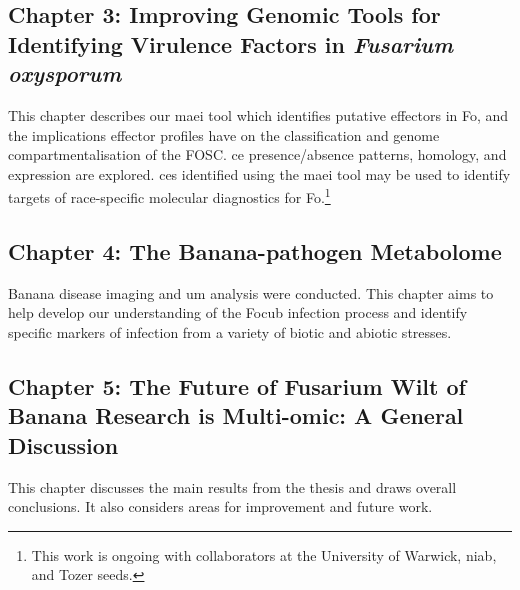 \subsection{Chapter 3: Improving Genomic Tools for Identifying Virulence Factors in \textit{Fusarium oxysporum}} 

This chapter describes our \acf{maei} tool which identifies putative effectors in \acl{Fo}, and the implications effector profiles have on the classification and genome compartmentalisation of the \acl{FOSC}. \Acl{ce} presence/absence patterns, homology, and expression are explored. \Aclp{ce} identified using the \ac{maei} tool may be used to identify targets of race-specific molecular diagnostics for \acl{Fo}.\footnote{This work is ongoing with collaborators at the University of Warwick, \acl{niab}, and Tozer seeds.} 

\subsection{Chapter 4: The Banana-pathogen Metabolome}

Banana disease imaging and \acl{um} analysis were conducted. This chapter
aims to help develop our understanding of the \acl{Focub} infection process and identify specific markers of infection from a variety of biotic and abiotic stresses. 

\subsection{Chapter 5: The Future of Fusarium Wilt of Banana Research is Multi-omic: A General Discussion}
This chapter discusses the main results from the thesis and draws overall conclusions. It also considers areas for improvement and future work. 


 

 



 



 



 